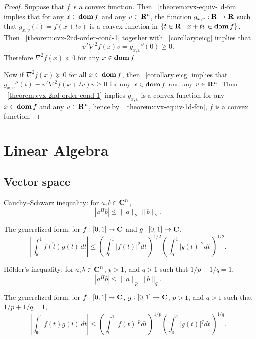 \documentclass[10pt, twoside]{book}   	%
\begin{document}
\begin{proof}
Suppose that $f$ is a convex function.
Then \theoremname~\ref{theorem:cvx-equiv-1d-fcn} implies that
for any $x\in\mathop{\bf dom} f$ and any $v\in\mathbf{R}^n$,
the function $g_{x,v}:\mathbf{R}\to\mathbf{R}$ such that $g_{x,v}(t) = f(x+tv)$
is a convex function in $\{t\in\mathbf{R}~|~x+tv \in \mathop{\bf dom} f\}$.
Then \theoremname~\ref{theorem:cvx-2nd-order-cond-1} together with \corollaryname~\ref{corollary:eicg}
implies that
\[
v^T \nabla^2 f(x) v = g_{x,v}''(0) \geq0.
\]
Therefore $\nabla^2 f(x) \succeq 0$ for any $x \in \mathop{\bf dom} f$.

Now if $\nabla^2 f(x) \succeq 0$ for all $x\in\mathop{\bf dom} f$,
then
\corollaryname~\ref{corollary:eicg}
implies that
$g_{x,v}''(t) = v^T \nabla^2 f(x+tv) v \geq0$ for any $x \in \mathop{\bf dom} f$ and any $v\in\mathbf{R}^n$.
Then \theoremname~\ref{theorem:cvx-2nd-order-cond-1} implies
$g_{x,v}$ is a convex function for any $x \in \mathop{\bf dom} f$ and any $v\in\mathbf{R}^n$,
hence by \theoremname~\ref{theorem:cvx-equiv-1d-fcn},
$f$ is a convex function.
\end{proof}



\chapter{Linear Algebra}

\section{Vector space}

Cauchy–Schwarz inequality: for $a,b\in{\mbox{\bf C}}^n$,
\begin{equation}
|a^H b| \leq \|a\|_2 \|b\|_2.
\end{equation}

The generalized form:
for $f:[0,1] \to {\mbox{\bf C}}$ and $g:[0,1] \to {\mbox{\bf C}}$,
\begin{equation}
\left|\int_{0}^1 \overline{f(t)} g(t) \, dt \right|
\leq
\left(\int_0^1 |f(t)|^2 dt \, \right)^{1/2}
\left(\int_0^1 |g(t)|^2 dt \, \right)^{1/2}.
\end{equation}

H\"older's inequality: for $a,b\in{\mbox{\bf C}}^n$, $p>1$, and $q>1$ such that $1/p+1/q=1$,
\begin{equation}
|a^H b| \leq \|a\|_p \|b\|_q.
\end{equation}

The generalized form:
for $f:[0,1] \to {\mbox{\bf C}}$, $g:[0,1] \to {\mbox{\bf C}}$,
$p>1$, and $q>1$ such that $1/p+1/q=1$,
\begin{equation}
\left|\int_{0}^1 \overline{f(t)} g(t) \, dt \right|
\leq
\left(\int_0^1 |f(t)|^p dt \, \right)^{1/p}
\left(\int_0^1 |g(t)|^q dt \, \right)^{1/q}.
\end{equation}
\end{document}
